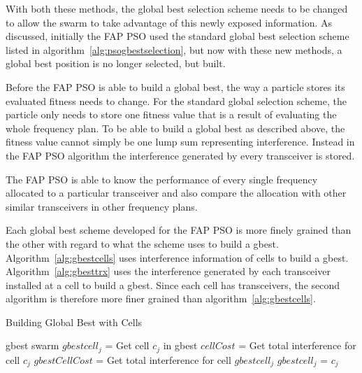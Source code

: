 With both these methods, the global best selection scheme needs to be changed to allow the swarm to take advantage of this newly exposed information. As discussed, initially the FAP PSO used the standard global best selection scheme listed in algorithm~\ref{alg:psogbestselection}, but now with these new methods, a global best position is no longer selected, but built.

Before the FAP PSO is able to build a global best, the way a particle stores its evaluated fitness needs to change. For the standard global selection scheme, the particle only needs to store one fitness value that is a result of evaluating the whole frequency plan. To be able to build a global best as described above, the fitness value cannot simply be one lump sum representing interference. Instead in the FAP PSO algorithm the interference generated by every transceiver is stored.

The FAP PSO is able to know the performance of every single frequency allocated to a particular transceiver and also compare the allocation with other similar transceivers in other frequency plans.

Each global best scheme developed for the FAP PSO is more finely grained than the other with regard to what the scheme uses to build a gbest. Algorithm~\ref{alg:gbestcells} uses interference information of cells to build a gbest. Algorithm~\ref{alg:gbesttrx} uses the interference generated by each transceiver installed at a cell to build a gbest. Since each cell has transceivers, the second algorithm is therefore more finer grained than algorithm~\ref{alg:gbestcells}.

\begin{algorithm}[H]
\caption{Building Global Best with Cells}
\label{alg:gbestcells}
\begin{algorithmic}[1]
\Require gbest
\Require swarm
		\State $gbestcell_j$ = Get cell $c_j$ in gbest
		\State $cellCost$ = Get total interference for cell $c_j$
		\State $gbestCellCost$ = Get total interference for cell $gbestcell_j$
			\State $gbestcell_j$ = $c_j$
		\EndIf
	\EndFor
\EndFor
\end{algorithmic}
\end{algorithm}

